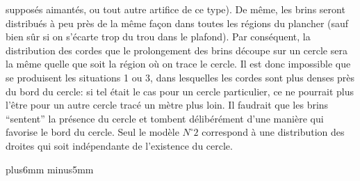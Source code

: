suppos\'es aimant\'es, ou tout autre artifice de ce type). De m\^eme,  
les brins seront distribu\'es \`a peu pr\`es de la m\^eme fa\c con dans  
toutes les r\'egions du plancher (sauf bien s\^ur si on s'\'ecarte trop du 
trou dans le plafond). Par cons\'equent, la distribution des cordes que  
le prolongement des brins d\'ecoupe sur un cercle sera la m\^eme quelle 
que soit la r\'egion o\`u on trace le cercle. Il est donc impossible que se 
produisent les situations 1 ou 3, dans lesquelles les cordes sont plus 
denses pr\`es du bord du cercle: si tel \'etait le cas pour un cercle 
particulier, ce ne pourrait plus l'\^etre pour un autre cercle trac\'e un 
m\`etre plus loin. Il faudrait que les brins ``sentent'' la pr\'esence du 
cercle et tombent d\'elib\'er\'ement d'une mani\`ere qui favorise le 
bord du cercle. Seul le mod\`ele $N^\circ 2$ correspond \`a une 
distribution des droites qui soit ind\'ependante de l'existence du cercle. 
 
\vskip7mm plus6mm minus5mm
 
